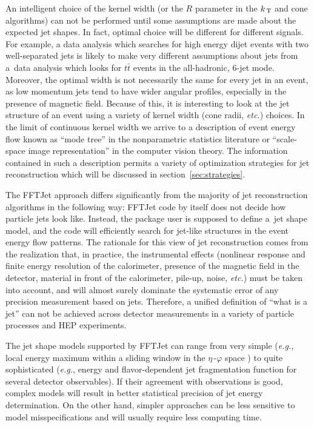 \documentclass[epsf,12pt,titlepage]{article}
\newcommand{\sub}[1]{\ensuremath{_{\mbox{\scriptsize \,#1}}}}
\def\KT {\mbox{$k\sub{T}$} }
\def\epspace {$\eta$\,-$\varphi$ space }
\begin{document}
An intelligent choice of the kernel width (or the $R$ parameter in the \KT
and cone algorithms) can not be performed until
some assumptions are made about the expected jet shapes. In fact,
optimal choice will be different for different signals. For example,
a data analysis which searches for high energy dijet events with two well-separated
jets is likely to make very different assumptions about jets from a~data
analysis which looks for $t\bar{t}$ events in the all-hadronic, 6-jet mode.
Moreover, the optimal width is not necessarily the same for every jet
in an event, as low momentum jets tend to have wider angular profiles,
especially in the presence of magnetic field. Because of this, it is
interesting to look at the jet structure of an event using a variety of
kernel width (cone radii, {\it etc.}) choices. In the limit of continuous
kernel width we arrive to a description of event energy flow known
as ``mode tree'' in the nonparametric statistics literature or
``scale-space image representation'' in the computer vision theory.
The information contained in such a description permits a variety of
optimization strategies for jet reconstruction which will be discussed
in section~\ref{sec:strategies}.

The FFTJet approach differs significantly from the majority of
jet reconstruction algorithms in the following way: FFTJet 
code by itself does not decide how
particle jets look like. Instead, the package user
is supposed to define a~jet shape model, and the
code will efficiently search for jet-like structures in the event
energy flow
patterns. The rationale for this view of jet reconstruction comes
from the realization that, in practice, the instrumental effects
(nonlinear response and finite energy resolution of the
calorimeter, presence of the
magnetic field in the detector, material in front of
the calorimeter, pile-up, noise, 
{\it etc.}) must be taken into account,
and will almost surely dominate the systematic error
of any precision measurement based on jets.
Therefore, a unified definition of ``what is a jet'' 
can not be achieved across detector measurements
in a variety of particle processes and HEP experiments.

The jet shape models supported by FFTJet
can range from very simple ({\it e.g.}, local
energy maximum within a sliding window in the \epspace\!\!) to quite
sophisticated ({\it e.g.}, energy and flavor-dependent jet fragmentation
function for several detector observables). If their
agreement with observations is good, complex models will
result in better statistical precision of jet energy determination.
On the other hand, simpler approaches can be less sensitive
to model misspecifications and will usually require less computing time.
\end{document}
